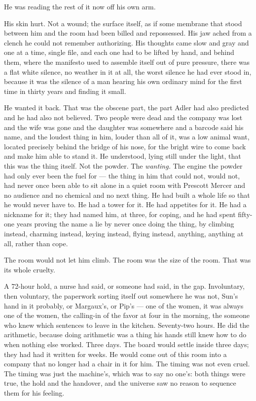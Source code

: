 \documentclass[11pt,openany]{book}
\newcommand{\scenebreak}{\par\vspace{0.5\baselineskip}\begin{center}\textasteriskcentered\quad\textasteriskcentered\quad\textasteriskcentered\end{center}\vspace{0.5\baselineskip}\par}
\begin{document}
He was reading the rest of it now off his own arm.

His skin hurt. Not a wound; the surface itself, as if some membrane that stood between him and the room had been billed and repossessed. His jaw ached from a clench he could not remember authorizing. His thoughts came slow and gray and one at a time, single file, and each one had to be lifted by hand, and behind them, where the manifesto used to assemble itself out of pure pressure, there was a flat white silence, no weather in it at all, the worst silence he had ever stood in, because it was the silence of a man hearing his own ordinary mind for the first time in thirty years and finding it small.

He wanted it back. That was the obscene part, the part Adler had also predicted and he had also not believed. Two people were dead and the company was lost and the wife was gone and the daughter was somewhere and a barcode said his name, and the loudest thing in him, louder than all of it, was a low animal want, located precisely behind the bridge of his nose, for the bright wire to come back and make him able to stand it. He understood, lying still under the light, that this was the thing itself. Not the powder. The \textit{wanting.} The engine the powder had only ever been the fuel for --- the thing in him that could not, would not, had never once been able to sit alone in a quiet room with Prescott Mercer and no audience and no chemical and no next thing. He had built a whole life so that he would never have to. He had a tower for it. He had appetites for it. He had a nickname for it; they had named him, at three, for coping, and he had spent fifty-one years proving the name a lie by never once doing the thing, by climbing instead, charming instead, keying instead, flying instead, anything, anything at all, rather than cope.

The room would not let him climb. The room was the size of the room. That was its whole cruelty.


\scenebreak


A 72-hour hold, a nurse had said, or someone had said, in the gap. Involuntary, then voluntary, the paperwork sorting itself out somewhere he was not, Sun's hand in it probably, or Margaux's, or Pip's --- one of the women, it was always one of the women, the calling-in of the favor at four in the morning, the someone who knew which sentences to leave in the kitchen. Seventy-two hours. He did the arithmetic, because doing arithmetic was a thing his hands still knew how to do when nothing else worked. Three days. The board would settle inside three days; they had had it written for weeks. He would come out of this room into a company that no longer had a chair in it for him. The timing was not even cruel. The timing was just the machine's, which was to say no one's: both things were true, the hold and the handover, and the universe saw no reason to sequence them for his feeling.
\end{document}
